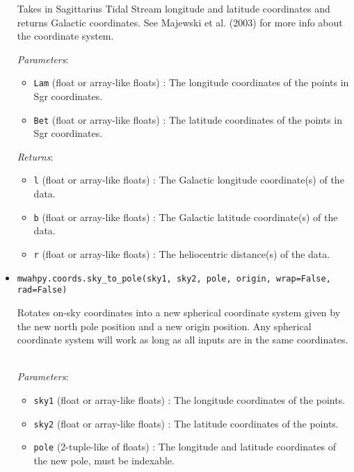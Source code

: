 \documentclass{article}
\begin{document}
\begin{itemize}
Takes in Sagittarius Tidal Stream longitude and latitude coordinates and returns Galactic coordinates. See Majewski et al. (2003) for more info about the coordinate system. 

\textit{Parameters}: \begin{itemize}

\item \verb!Lam! (float or array-like floats) : The longitude coordinates of the points in Sgr coordinates.

\item \verb!Bet! (float or array-like floats) : The latitude coordinates of the points in Sgr coordinates.

\end{itemize}

\textit{Returns}: \begin{itemize}

\item \verb!l! (float or array-like floats) : The Galactic longitude coordinate(s) of the data.

\item \verb!b! (float or array-like floats) : The Galactic latitude coordinate(s) of the data.

\item \verb!r! (float or array-like floats) : The heliocentric distance(s) of the data.

\end{itemize}



\item \verb!mwahpy.coords.sky_to_pole(sky1, sky2, pole, origin, wrap=False, rad=False)!

Rotates on-sky coordinates into a new spherical coordinate system given by the new north pole position and a new origin position. Any spherical coordinate system will work as long as all inputs are in the same coordinates. \

\textit{Parameters}: \begin{itemize}

\item \verb!sky1! (float or array-like floats) : The longitude coordinates of the points.

\item \verb!sky2! (float or array-like floats) : The latitude coordinates of the points.

\item \verb!pole! (2-tuple-like of floats) : The longitude and latitude coordinates of the new pole, must be indexable.


\end{itemize}
\end{itemize}
\end{document}
